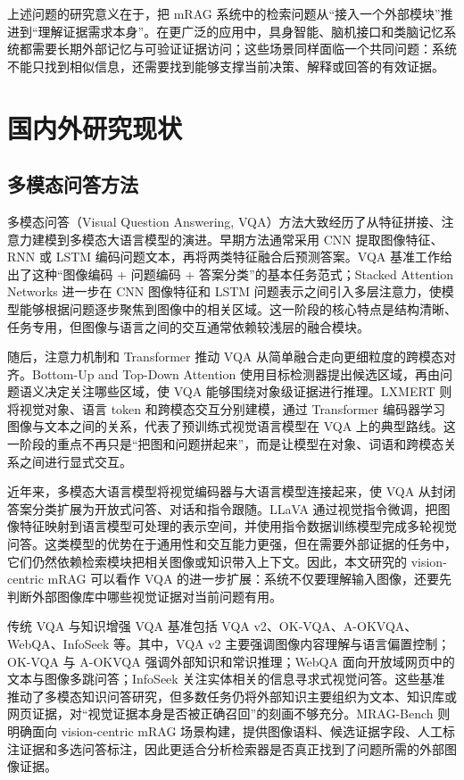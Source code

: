 上述问题的研究意义在于，把 mRAG 系统中的检索问题从“接入一个外部模块”推进到“理解证据需求本身”。在更广泛的应用中，具身智能、脑机接口和类脑记忆系统都需要长期外部记忆与可验证证据访问；这些场景同样面临一个共同问题：系统不能只找到相似信息，还需要找到能够支撑当前决策、解释或回答的有效证据\cite{xie2024embodiedrag,caria2025bci,zhao2025memoryrecall,genesis2025}。

\section{国内外研究现状}

\subsection{多模态问答方法}

多模态问答（Visual Question Answering, VQA）方法大致经历了从特征拼接、注意力建模到多模态大语言模型的演进。早期方法通常采用 CNN 提取图像特征、RNN 或 LSTM 编码问题文本，再将两类特征融合后预测答案。VQA 基准工作给出了这种“图像编码 + 问题编码 + 答案分类”的基本任务范式\cite{antol2015vqa}；Stacked Attention Networks 进一步在 CNN 图像特征和 LSTM 问题表示之间引入多层注意力，使模型能够根据问题逐步聚焦到图像中的相关区域\cite{yang2016san}。这一阶段的核心特点是结构清晰、任务专用，但图像与语言之间的交互通常依赖较浅层的融合模块。

随后，注意力机制和 Transformer 推动 VQA 从简单融合走向更细粒度的跨模态对齐。Bottom-Up and Top-Down Attention 使用目标检测器提出候选区域，再由问题语义决定关注哪些区域，使 VQA 能够围绕对象级证据进行推理\cite{anderson2018bottomup}。LXMERT 则将视觉对象、语言 token 和跨模态交互分别建模，通过 Transformer 编码器学习图像与文本之间的关系，代表了预训练式视觉语言模型在 VQA 上的典型路线\cite{tan2019lxmert}。这一阶段的重点不再只是“把图和问题拼起来”，而是让模型在对象、词语和跨模态关系之间进行显式交互。

近年来，多模态大语言模型将视觉编码器与大语言模型连接起来，使 VQA 从封闭答案分类扩展为开放式问答、对话和指令跟随。LLaVA 通过视觉指令微调，把图像特征映射到语言模型可处理的表示空间，并使用指令数据训练模型完成多轮视觉问答\cite{liu2023llava}。这类模型的优势在于通用性和交互能力更强，但在需要外部证据的任务中，它们仍然依赖检索模块把相关图像或知识带入上下文。因此，本文研究的 vision-centric mRAG 可以看作 VQA 的进一步扩展：系统不仅要理解输入图像，还要先判断外部图像库中哪些视觉证据对当前问题有用。

传统 VQA 与知识增强 VQA 基准包括 VQA v2\cite{goyal2017vqa}、OK-VQA\cite{marino2019okvqa}、A-OKVQA\cite{schwenk2022aokvqa}、WebQA\cite{chang2022webqa}、InfoSeek\cite{chen2023infoseek} 等。其中，VQA v2 主要强调图像内容理解与语言偏置控制；OK-VQA 与 A-OKVQA 强调外部知识和常识推理；WebQA 面向开放域网页中的文本与图像多跳问答；InfoSeek 关注实体相关的信息寻求式视觉问答。这些基准推动了多模态知识问答研究，但多数任务仍将外部知识主要组织为文本、知识库或网页证据，对“视觉证据本身是否被正确召回”的刻画不够充分。MRAG-Bench 则明确面向 vision-centric mRAG 场景构建，提供图像语料、候选证据字段、人工标注证据和多选问答标注\cite{hu2024mragbench}，因此更适合分析检索器是否真正找到了问题所需的外部图像证据。

